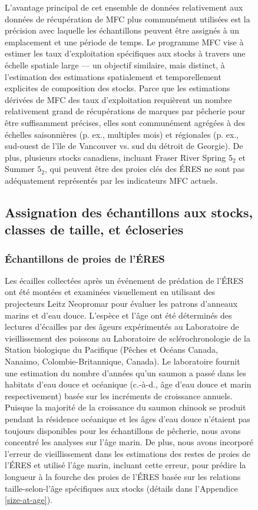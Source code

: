 \begin{figure}[H]
L'avantage principal de cet ensemble de données relativement aux données de récupération de MFC plus communément utilisées est la précision avec laquelle les échantillons peuvent être assignés à un emplacement et une période de temps. Le programme MFC vise à estimer les taux d'exploitation spécifiques aux stocks à travers une échelle spatiale large — un objectif similaire, mais distinct, à l'estimation des estimations spatialement et temporellement explicites de composition des stocks. Parce que les estimations dérivées de MFC des taux d'exploitation requièrent un nombre relativement grand de récupérations de marques par pêcherie pour être suffisamment précises, elles sont communément agrégées à des échelles saisonnières (p. ex., multiples mois) et régionales (p. ex., sud-ouest de l'île de Vancouver vs. sud du détroit de Georgie). De plus, plusieurs stocks canadiens, incluant Fraser River Spring $5_2$ et Summer $5_2$, qui peuvent être des proies clés des ÉRES ne sont pas adéquatement représentés par les indicateurs MFC actuels.

\subsection{Assignation des échantillons aux stocks, classes de taille, et écloseries}

\subsubsection{Échantillons de proies de l'ÉRES}

Les écailles collectées après un événement de prédation de l'ÉRES ont été montées et examinées visuellement en utilisant des projecteurs Leitz Neopromar pour évaluer les patrons d'anneaux marins et d'eau douce. L'espèce et l'âge ont été déterminés des lectures d'écailles par des âgeurs expérimentés au Laboratoire de vieillissement des poissons au Laboratoire de sclérochronologie de la Station biologique du Pacifique (Pêches et Océans Canada, Nanaimo, Colombie-Britannique, Canada). Le laboratoire fournit une estimation du nombre d'années qu'un saumon a passé dans les habitats d'eau douce et océanique (c.-à-d., âge d'eau douce et marin respectivement) basée sur les incréments de croissance annuels. Puisque la majorité de la croissance du saumon chinook se produit pendant la résidence océanique et les âges d'eau douce n'étaient pas toujours disponibles pour les échantillons de pêcherie, nous avons concentré les analyses sur l'âge marin. De plus, nous avons incorporé l'erreur de vieillissement dans les estimations des restes de proies de l'ÉRES et utilisé l'âge marin, incluant cette erreur, pour prédire la longueur à la fourche des proies de l'ÉRES basée sur les relations taille-selon-l'âge spécifiques aux stocks (détails dans l'Appendice \ref{size-at-age}).


\end{figure}
